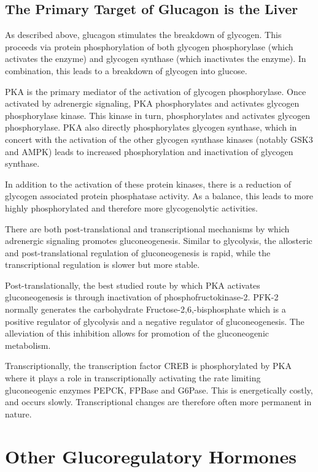 \documentclass{tufte-handout}
\begin{document}
\subsection{The Primary Target of Glucagon is the Liver}

As described above, glucagon stimulates the breakdown of glycogen.  This proceeds via protein phosphorylation of both glycogen phosphorylase (which activates the enzyme) and glycogen synthase (which inactivates the enzyme).  In combination, this leads to a breakdown of glycogen into glucose.

PKA is the primary mediator of the activation of glycogen phosphorylase.  Once activated by adrenergic signaling, PKA phosphorylates and activates glycogen phosphorylase kinase.  This kinase in turn, phosphorylates and activates glycogen phosphorylase\citep{Krebs1956}.  PKA also directly phosphorylates glycogen synthase, which in concert with the activation of the other glycogen synthase kinases (notably GSK3 and AMPK) leads to increased phosphorylation and inactivation of glycogen synthase.

In addition to the activation of these protein kinases, there is a reduction of glycogen associated protein phosphatase activity.  As a balance, this leads to more highly phosphorylated and therefore more glycogenolytic activities.

  There are both post-translational and transcriptional mechanisms by which adrenergic signaling promotes gluconeogenesis.  Similar to glycolysis, the allosteric and post-translational regulation of gluconeogenesis is rapid, while the transcriptional regulation is slower but more stable.

Post-translationally, the best studied route by which PKA activates gluconeogenesis is through inactivation of phosphofructokinase-2.  PFK-2 normally generates the carbohydrate Fructose-2,6,-bisphosphate which is a positive regulator of glycolysis and a negative regulator of gluconeogenesis.  The alleviation of this inhibition allows for promotion of the gluconeogenic metabolism.  

Transcriptionally, the transcription factor CREB is phosphorylated by PKA where it plays a role in transcriptionally activating the rate limiting gluconeogenic enzymes PEPCK, FPBase and G6Pase.  This is energetically costly, and occurs slowly.  Transcriptional changes are therefore often more permanent in nature.

\section{Other Glucoregulatory Hormones}
\end{document}
